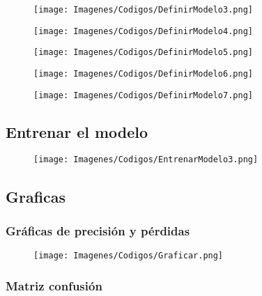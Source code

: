 \documentclass{report}
\begin{document}
\begin{figure}[H]
    \raggedright
    \texttt{[image: Imagenes/Codigos/DefinirModelo3.png]}
\end{figure}


\begin{figure}[H]
    \raggedright
    \texttt{[image: Imagenes/Codigos/DefinirModelo4.png]}
\end{figure}


\begin{figure}[H]
    \raggedright
    \texttt{[image: Imagenes/Codigos/DefinirModelo5.png]}
\end{figure}


\begin{figure}[H]
    \raggedright
    \texttt{[image: Imagenes/Codigos/DefinirModelo6.png]}
\end{figure}


\begin{figure}[H]
    \raggedright
    \texttt{[image: Imagenes/Codigos/DefinirModelo7.png]}
\end{figure}







\subsection{Entrenar el modelo}

\begin{figure}[H]
    \raggedright
    \texttt{[image: Imagenes/Codigos/EntrenarModelo3.png]}
\end{figure}






\subsection{Graficas}


\subsubsection{Gráficas de precisión y pérdidas}

\begin{figure}[H]
    \raggedright
    \texttt{[image: Imagenes/Codigos/Graficar.png]}
\end{figure}


\subsubsection{Matriz confusión}
\end{document}
